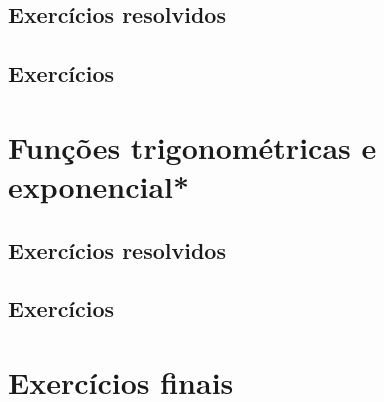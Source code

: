 \subsection*{Exercícios resolvidos}

\construirExeresol


\subsection*{Exercícios}

\construirExer


\section{Funções trigonométricas e exponencial*}
\construirSec

\subsection*{Exercícios resolvidos}

\construirExeresol

\subsection*{Exercícios}

\construirExer

\section{Exercícios finais}

\construirExer




